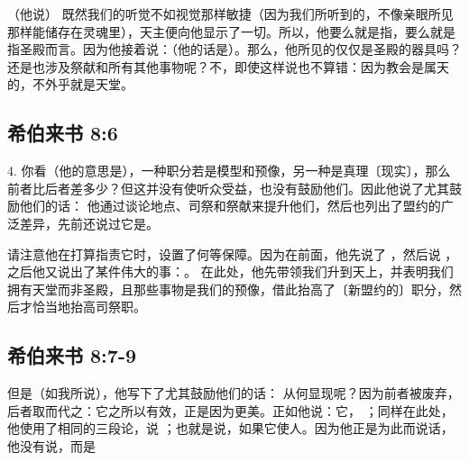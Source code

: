 （他说） 既然我们的听觉不如视觉那样敏捷（因为我们所听到的，不像亲眼所见那样能储存在灵魂里），天主便向他显示了一切。所以，他要么就是指，要么就是指圣殿而言。因为他接着说：（他的话是）。那么，他所见的仅仅是圣殿的器具吗？还是也涉及祭献和所有其他事物呢？不，即使这样说也不算错：因为教会是属天的，不外乎就是天堂。\par


\subsection{希伯来书 8:6}

4.  你看（他的意思是），一种职分若是模型和预像，另一种是真理〔现实〕，那么前者比后者差多少？但这并没有使听众受益，也没有鼓励他们。因此他说了尤其鼓励他们的话： 他通过谈论地点、司祭和祭献来提升他们，然后也列出了盟约的广泛差异，先前还说过它是。\par

请注意他在打算指责它时，设置了何等保障。因为在前面，他先说了 ，然后说 ，之后他又说出了某件伟大的事：。 在此处，他先带领我们升到天上，并表明我们拥有天堂而非圣殿，且那些事物是我们的预像，借此抬高了〔新盟约的〕职分，然后才恰当地抬高司祭职。\par


\subsection{希伯来书 8:7-9}

但是（如我所说），他写下了尤其鼓励他们的话： 从何显现呢？因为前者被废弃，后者取而代之：它之所以有效，正是因为更美。正如他说：它， ；同样在此处，他使用了相同的三段论，说  ；也就是说，如果它使人。因为他正是为此而说话，他没有说，而是 \par

